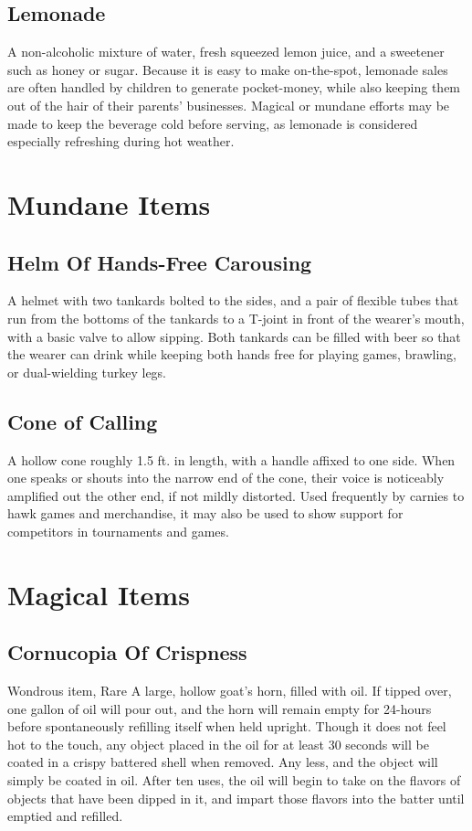 \documentclass[10pt,a4paper,twoside,bg=print,twocolumn,openany,nodeprecatedcode]{dndbook}
\begin{document}
\subsection{Lemonade}
A non-alcoholic mixture of water, fresh squeezed lemon juice, and a sweetener such as honey or sugar. Because it is easy to make on-the-spot, lemonade sales are often handled by children to generate pocket-money, while also keeping them out of the hair of their parents' businesses. Magical or mundane efforts may be made to keep the beverage cold before serving, as lemonade is considered especially refreshing during hot weather.
\section{Mundane Items}
\subsection{Helm Of Hands-Free Carousing}
A helmet with two tankards bolted to the sides, and a pair of flexible tubes that run from the bottoms of the tankards to a T-joint in front of the wearer's mouth, with a basic valve to allow sipping. Both tankards can be filled with beer so that the wearer can drink while keeping both hands free for playing games, brawling, or dual-wielding turkey legs.
\subsection{Cone of Calling}
A hollow cone roughly 1.5 ft. in length, with a handle affixed to one side. When one speaks or shouts into the narrow end of the cone, their voice is noticeably amplified out the other end, if not mildly distorted. Used frequently by carnies to hawk games and merchandise, it may also be used to show support for competitors in tournaments and games.
\section{Magical Items}
\subsection{Cornucopia Of Crispness}
Wondrous item, Rare
A large, hollow goat's horn, filled with oil. If tipped over, one gallon of oil will pour out, and the horn will remain empty for 24-hours before spontaneously refilling itself when held upright. Though it does not feel hot to the touch, any object placed in the oil for at least 30 seconds will be coated in a crispy battered shell when removed. Any less, and the object will simply be coated in oil. After ten uses, the oil will begin to take on the flavors of objects that have been dipped in it, and impart those flavors into the batter until emptied and refilled. 
\end{document}
